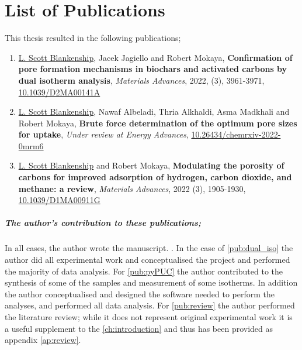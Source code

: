 \cleardoublepage

\chapter*{List of Publications}

This thesis resulted in the following publications;

\begin{enumerate}[label=\Roman*, ref={\textbf{Publication \Roman*}}]
    \item \underline{L. Scott Blankenship}, Jacek Jagiello and Robert Mokaya, \textbf{Confirmation of pore formation mechanisms in biochars and activated carbons by dual isotherm analysis}, \textit{Materials Advances}, 2022, (3), 3961-3971, \href{https://doi.org/10.1039/D2MA00141A}{10.1039/D2MA00141A}
    \label{pub:dual_iso}
    \item \underline{L. Scott Blankenship}, Nawaf Albeladi, Thria Alkhaldi, Asma Madkhali and Robert Mokaya, \textbf{Brute force determination of the optimum pore sizes for  uptake}, \textit{Under review at Energy Advances}, \href{https://doi.org/10.26434/chemrxiv-2022-0mrm6}{10.26434/chemrxiv-2022-0mrm6}
    \label{pub:pyPUC}
    \item \underline{L. Scott Blankenship} and Robert Mokaya, \textbf{Modulating the porosity of carbons for improved adsorption of hydrogen, carbon dioxide, and methane: a review}, \textit{Materials Advances}, 2022 (3), 1905-1930, \href{https://doi.org/10.1039/D1MA00911G}{10.1039/D1MA00911G}
    \label{pub:review}
\end{enumerate}

\paragraph{The author's contribution to these publications;}
In all cases, the author wrote the manuscript. . In the case of \ref{pub:dual_iso} the author did all experimental work and conceptualised the project and performed the majority of data analysis. For \ref{pub:pyPUC} the author contributed to the synthesis of some of the samples and measurement of some isotherms. In addition the author conceptualised and designed the software needed to perform the analyses, and performed all data analysis. For \ref{pub:review} the author performed the literature review; while it does not represent original experimental work it is a useful supplement to the \ref{ch:introduction} and thus has been provided as appendix \ref{ap:review}.

